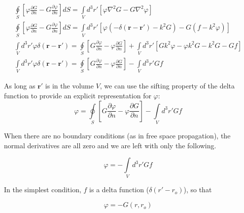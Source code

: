 \begin{equation}
\begin{gathered}
\oint\limits_{S} \left[ \varphi\frac{\partial G}{\partial n} - G\frac{\partial \varphi}{\partial n} \right]dS = \int\limits_{V}d^3r' \left[ \varphi\nabla^2G- G \nabla^2 \varphi\right] \\
\oint\limits_{S} \left[ \varphi\frac{\partial G}{\partial n} - G\frac{\partial \varphi}{\partial n} \right]dS = \int\limits_{V}d^3r' \left[ \varphi \left(-\delta\left(\mathbf{r}-\mathbf{r}' \right) - k^2G\right)- G \left(f - k^2\varphi \right)\right] \\
\int\limits_{V}d^3r'\varphi\delta\left(\mathbf{r}-\mathbf{r}' \right) = \oint\limits_{S}\left[G\frac{\partial \varphi}{\partial n} - \varphi\frac{\partial G}{\partial n} \right] +\int\limits_{V}d^3r'\left[ Gk^2\varphi - \varphi k^2G-k^2G - Gf \right] \\
\int\limits_{V}d^3r'\varphi\delta\left(\mathbf{r}-\mathbf{r}' \right) = \oint\limits_{S}\left[G\frac{\partial \varphi}{\partial n} - \varphi\frac{\partial G}{\partial n} \right] -\int\limits_{V}d^3r' Gf
\end{gathered}
\label{gf_eq:10}
\end{equation}
\renewcommand{\baselinestretch}{2} \small\normalsize

As long as $\mathbf{r}'$ is in the volume $V$, we can use the sifting property of the delta function to provide an explicit representation for $\varphi$:
\begin{equation}
\boxed{\varphi = \oint\limits_{S}\left[G\frac{\partial \varphi}{\partial n} - \varphi\frac{\partial G}{\partial n} \right] -\int\limits_{V}d^3r' Gf}
\label{gf_eq:11}
\end{equation}
\renewcommand{\baselinestretch}{2} \small\normalsize

When there are no boundary conditions (as in free space propagation), the normal derivatives are all zero and we are left with only the following.

\begin{equation}
\varphi = -\int\limits_{V}d^3r' Gf
\label{gf_eq:11aa}
\end{equation}
\renewcommand{\baselinestretch}{2} \small\normalsize

In the simplest condition, $f$ is a delta function ($\delta(r'-r_o)$), so that

\begin{equation}
\varphi = -G(r,r_o)
\label{gf_eq:11ab}
\end{equation}
\renewcommand{\baselinestretch}{2} \small\normalsize

